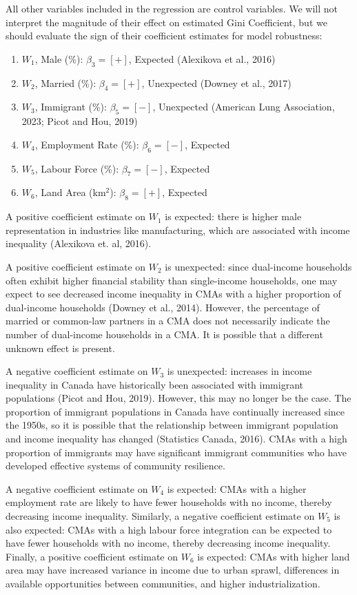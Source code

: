 \documentclass[AEJ]{AEA}
\begin{document}
All other variables included in the regression are control variables. We will 
not interpret the magnitude of their effect on estimated Gini Coefficient, but we should
evaluate the sign of their coefficient estimates for model robustness:
\begin{enumerate}
  \item $W_1$, Male (\%): $\beta_3 = [+]$, Expected (Alexikova et al., 2016)
  \item $W_2$, Married (\%): $\beta_4 = [+]$, Unexpected (Downey et al., 2017)
  \item $W_3$, Immigrant (\%): $\beta_5 = [-]$, Unexpected (American Lung Association, 2023; Picot and Hou, 2019)
  \item $W_4$, Employment Rate (\%): $\beta_6 = [-]$, Expected
  \item $W_5$, Labour Force (\%): $\beta_7 = [-]$, Expected
  \item $W_6$, Land Area (km$^2$): $\beta_8 = [+]$, Expected
\end{enumerate}

A positive coefficient estimate on $W_1$ is expected: there is higher male representation
in industries like manufacturing, which are associated with income inequality (Alexikova et. al, 2016).

A positive coefficient estimate on $W_2$ is unexpected: since dual-income households 
often exhibit higher financial stability than single-income households, one may expect
to see decreased income inequality in CMAs with a higher proportion of dual-income households
(Downey et al., 2014). However, the percentage of married or common-law partners in a 
CMA does not necessarily indicate the number of dual-income households in a CMA. It is possible
that a different unknown effect is present.

A negative coefficient estimate on $W_3$ is unexpected: 
increases in income inequality in Canada have historically 
been associated with immigrant populations (Picot and Hou, 2019). However, this may no longer
be the case. The proportion of immigrant populations in Canada have continually increased
since the 1950s, so it is possible that the relationship between immigrant population and 
income inequality has changed (Statistics Canada, 2016). CMAs with a high proportion of
immigrants may have significant immigrant communities who have developed effective
systems of community resilience.

A negative coefficient estimate on $W_4$ is expected: CMAs with a higher employment
rate are likely to have fewer households with no income, thereby decreasing income
inequality. Similarly, a negative coefficient estimate on $W_5$ is also expected:
CMAs with a high labour force integration can be expected to have fewer households
with no income, thereby decreasing income inequality. Finally, a positive coefficient
estimate on $W_6$ is expected: CMAs with higher land area may have increased variance
in income due to urban sprawl, differences in available opportunities between communities,
and higher industrialization.
\end{document}
